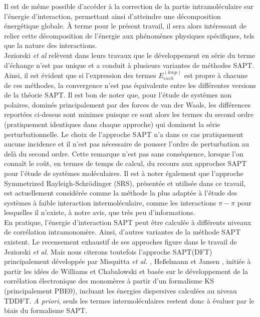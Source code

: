 	Il est de même possible d’accéder à la correction de la partie intramoléculaire sur l’énergie d’interaction, permettant ainsi d’atteindre une décomposition énergétique globale. À terme pour le présent travail, il sera alors intéressant de relier cette décomposition de l'énergie aux phénomènes physiques spécifiques, tels que la nature des interactions. \\
	
	Jeziorski \textit{et al} \cite{patkowski2004unified,jeziorski1994perturbation} relèvent dans leurs travaux que le développement en série du terme d’échange n’est pas unique et a conduit à plusieurs variantes de méthodes SAPT. Ainsi, il est évident que si l’expression des termes $E_{exch}^{(kmp)}$ est propre à chacune de ces méthodes, la convergence n'est pas équivalente entre les différentes versions de la théorie SAPT. Il est bon de noter que, pour l’étude de systèmes non polaires, dominés principalement par des forces de van der Waals, les différences reportées ci-dessus sont minimes puisque ce sont alors les termes du second ordre (pratiquement identiques dans chaque approche) qui dominent la série perturbationnelle. Le choix de l’approche SAPT n’a dans ce cas pratiquement aucune incidence et il n’est pas nécessaire de pousser l’ordre de perturbation au delà du second ordre. Cette remarque n’est pas sans conséquence, lorsque l’on connaît le coût, en termes de temps de calcul, du recours aux approches SAPT pour l’étude de systèmes moléculaires. Il est à noter également que l’approche Symmetrized Rayleigh-Schr\"{o}dinger (SRS), présentée et utilisée dans ce travail, est actuellement considérée comme la méthode la plus adaptée à l’étude des systèmes à faible interaction intermoléculaire, comme les interactions $\pi-\pi$ pour lesquelles il n’existe, à notre avis, que très peu d’informations.\\
	
	
	En pratique, l’énergie d'interaction SAPT peut être calculée à différents niveaux de corrélation intramonomère. Ainsi, d’autres variantes de la méthode SAPT existent.
	Le recensement exhaustif de ses approches figure dans le travail de Jeziorski \textit{et al}. Mais nous citerons toutefois l’approche SAPT(DFT) principalement développée par 
	Misquitta \textit{et al.} \cite{misquitta2005intermolecular}, Heßelmann et Jansen \cite{hesselmann2002first}, initiée à partir les idées de Williams et Chabalowski \cite{williams2001using} et basée sur le développement de la corrélation électronique des monomères à partir d’un formalisme KS (principalement PBE0), incluant les énergies dispersives calculées au niveau TDDFT. \textit{A priori}, seuls les termes intermoléculaires restent donc à évaluer par le biais du formalisme SAPT.\\
	
